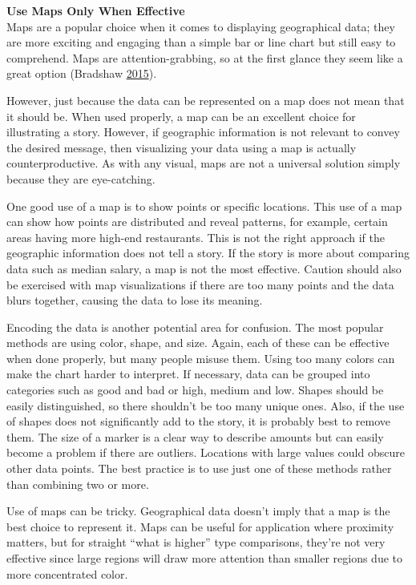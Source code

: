 \documentclass[]{book}
\begin{document}
\textbf{Use Maps Only When Effective}\\
Maps are a popular choice when it comes to displaying geographical data; they are more exciting and engaging than a simple bar or line chart but still easy to comprehend. Maps are attention-grabbing, so at the first glance they seem like a great option (Bradshaw \protect\hyperlink{ref-Bradshaw}{2015}).

However, just because the data can be represented on a map does not mean that it should be. When used properly, a map can be an excellent choice for illustrating a story. However, if geographic information is not relevant to convey the desired message, then visualizing your data using a map is actually counterproductive. As with any visual, maps are not a universal solution simply because they are eye-catching.

One good use of a map is to show points or specific locations. This use of a map can show how points are distributed and reveal patterns, for example, certain areas having more high-end restaurants. This is not the right approach if the geographic information does not tell a story. If the story is more about comparing data such as median salary, a map is not the most effective. Caution should also be exercised with map visualizations if there are too many points and the data blurs together, causing the data to lose its meaning.

Encoding the data is another potential area for confusion. The most popular methods are using color, shape, and size. Again, each of these can be effective when done properly, but many people misuse them. Using too many colors can make the chart harder to interpret. If necessary, data can be grouped into categories such as good and bad or high, medium and low. Shapes should be easily distinguished, so there shouldn't be too many unique ones. Also, if the use of shapes does not significantly add to the story, it is probably best to remove them. The size of a marker is a clear way to describe amounts but can easily become a problem if there are outliers. Locations with large values could obscure other data points. The best practice is to use just one of these methods rather than combining two or more.

Use of maps can be tricky. Geographical data doesn't imply that a map is the best choice to represent it. Maps can be useful for application where proximity matters, but for straight ``what is higher'' type comparisons, they're not very effective since large regions will draw more attention than smaller regions due to more concentrated color.
\end{document}
